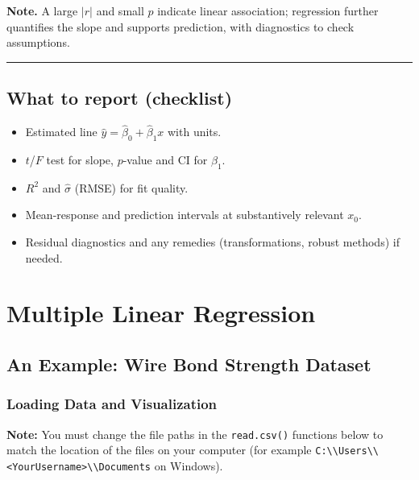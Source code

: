 \documentclass[
  letterpaper,
]{scrbook}
\providecommand{\tightlist}{%
  \setlength{\itemsep}{0pt}\setlength{\parskip}{0pt}}\usepackage{longtable,booktabs,array}
\begin{document}
\textbf{Note.} A large \(|r|\) and small \(p\) indicate linear
association; regression further quantifies the slope and supports
prediction, with diagnostics to check assumptions.

\begin{center}\rule{0.5\linewidth}{0.5pt}\end{center}

\section{What to report (checklist)}\label{what-to-report-checklist}

\begin{itemize}
\tightlist
\item
  Estimated line \(\hat y=\hat\beta_0+\hat\beta_1 x\) with units.
\item
  \(t\)/\(F\) test for slope, \(p\)-value and CI for \(\beta_1\).
\item
  \(R^2\) and \(\hat\sigma\) (RMSE) for fit quality.
\item
  Mean-response and prediction intervals at substantively relevant
  \(x_0\).
\item
  Residual diagnostics and any remedies (transformations, robust
  methods) if needed.
\end{itemize}


\chapter{Multiple Linear Regression}\label{multiple-linear-regression}

\section{An Example: Wire Bond Strength
Dataset}\label{an-example-wire-bond-strength-dataset}

\subsection{Loading Data and
Visualization}\label{loading-data-and-visualization}

\textbf{Note:} You must change the file paths in the \texttt{read.csv()}
functions below to match the location of the files on your computer (for
example
\texttt{C:\textbackslash{}\textbackslash{}Users\textbackslash{}\textbackslash{}\textless{}YourUsername\textgreater{}\textbackslash{}\textbackslash{}Documents}
on Windows).
\end{document}
